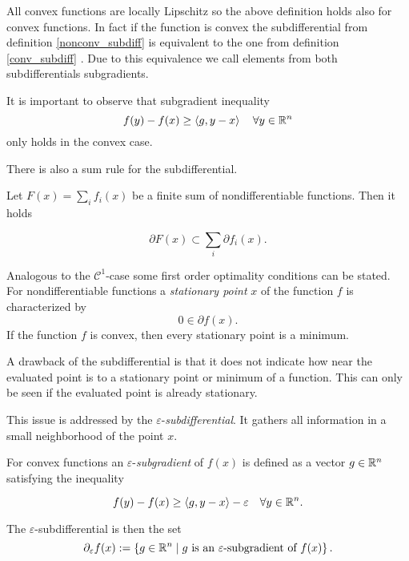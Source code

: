 All convex functions are locally Lipschitz \cite[Theorem 3.1.1, p. 16]{Hiriart-Urruty1996} so the above definition holds also for convex functions. In fact if the function is convex the subdifferential from definition \ref{nonconv_subdiff} is equivalent to the one from definition \ref{conv_subdiff} \cite[Proposition 2.2.7, p. 36]{Clarke1990}.
Due to this equivalence we call elements from both subdifferentials subgradients.

\begin{remark}
	It is important to observe that subgradient inequality 
	\[ f(y)-f(x) \geq \left\langle g,y-x \right\rangle \quad \forall y \in \mathbb{R}^n \]
	only holds in the convex case.
\end{remark}

There is also a sum rule for the subdifferential.

\begin{proposition}
	Let \(F(x)=\sum_i{f_i(x)}\) be a finite sum of nondifferentiable functions. Then it holds
	
	\[ \partial F(x) \subset \sum_i{\partial f_i(x)}. \]
\end{proposition}

Analogous to the \(\mathcal{C}^1\)-case some first order optimality conditions can be stated.
For nondifferentiable functions a \emph{stationary point} \(x\) of the function \(f\) is characterized by \cite[p. 38]{Clarke1990}
\[ 0 \in \partial f(x). \]
If the function \(f\) is convex, then every stationary point is a minimum.


A drawback of the subdifferential is that it does not indicate how near the evaluated point is to a stationary point or minimum of a function. This can only be seen if the evaluated point is already stationary.

This issue is addressed by the \(\varepsilon\)-\emph{subdifferential}. It gathers all information in a small neighborhood of the point \(x\).

For convex functions an \(\varepsilon\)-\emph{subgradient} of \(f(x)\) is defined as a vector \(g \in \mathbb{R}^n\) satisfying the inequality

\[ f(y)-f(x) \geq \left\langle g,y-x \right\rangle - \varepsilon \quad \forall y \in \mathbb{R}^n.\]

The \(\varepsilon\)-subdifferential is then the set
\[ \partial_{\varepsilon} f(x) := \left\{g \in \mathbb{R}^n \mid g \text{ is an } \varepsilon \text{-subgradient of } f(x) \right\}. \]

